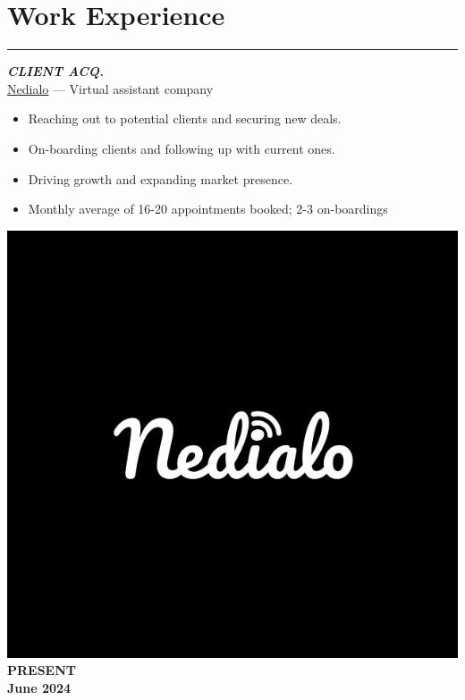 \documentclass[10pt]{article}
\newcommand{\fancy}[1]{\Large\textbf{\textit{#1}}}
\begin{document}

\section*{Work Experience}
\hrule
\vspace{3em}

\begin{minipage}{0.75\textwidth}
 \fancy{CLIENT ACQ.} \\
	{\large \href{https://www.linkedin.com/company/-nedialo/}{Nedialo} --- Virtual assistant company} \\
\begin{itemize}
    \item Reaching out to potential clients and securing new deals.
    \item On-boarding clients and following up with current ones.
    \item Driving growth and expanding market presence.
    \item Monthly average of 16-20 appointments booked; 2-3 on-boardings
\end{itemize}   
\end{minipage}
\hspace{10pt}
\begin{minipage}{0.2\textwidth}
\begin{center}
\vspace{20pt}
\includegraphics[width=\textwidth]{nedialo-black.jpg} \\
    \large\textbf{PRESENT \\June 2024} %
\end{center}
\end{minipage} %
\end{document}
